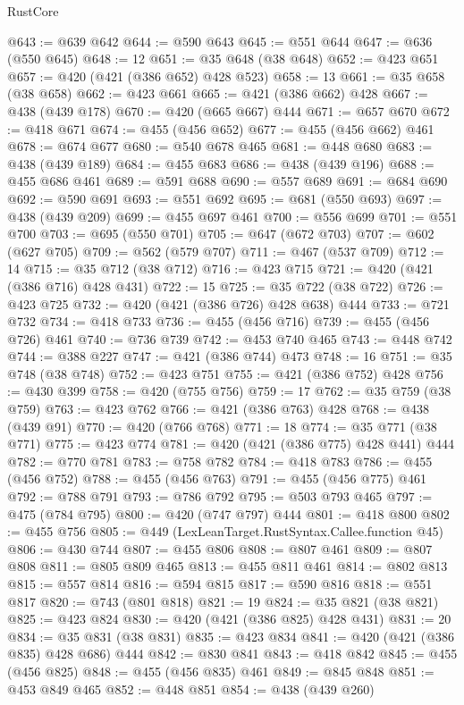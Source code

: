 \begin{lexlean}{RustCore}
\begin{coremodule}
@643 := @639 @642
@644 := @590 @643
@645 := @551 @644
@647 := @636 (@550 @645)
@648 := 12
@651 := @35 @648 (@38 @648)
@652 := @423 @651
@657 := @420 (@421 (@386 @652) @428 @523)
@658 := 13
@661 := @35 @658 (@38 @658)
@662 := @423 @661
@665 := @421 (@386 @662) @428
@667 := @438 (@439 @178)
@670 := @420 (@665 @667) @444
@671 := @657 @670
@672 := @418 @671
@674 := @455 (@456 @652)
@677 := @455 (@456 @662) @461
@678 := @674 @677
@680 := @540 @678 @465
@681 := @448 @680
@683 := @438 (@439 @189)
@684 := @455 @683
@686 := @438 (@439 @196)
@688 := @455 @686 @461
@689 := @591 @688
@690 := @557 @689
@691 := @684 @690
@692 := @590 @691
@693 := @551 @692
@695 := @681 (@550 @693)
@697 := @438 (@439 @209)
@699 := @455 @697 @461
@700 := @556 @699
@701 := @551 @700
@703 := @695 (@550 @701)
@705 := @647 (@672 @703)
@707 := @602 (@627 @705)
@709 := @562 (@579 @707)
@711 := @467 (@537 @709)
@712 := 14
@715 := @35 @712 (@38 @712)
@716 := @423 @715
@721 := @420 (@421 (@386 @716) @428 @431)
@722 := 15
@725 := @35 @722 (@38 @722)
@726 := @423 @725
@732 := @420 (@421 (@386 @726) @428 @638) @444
@733 := @721 @732
@734 := @418 @733
@736 := @455 (@456 @716)
@739 := @455 (@456 @726) @461
@740 := @736 @739
@742 := @453 @740 @465
@743 := @448 @742
@744 := @388 @227
@747 := @421 (@386 @744) @473
@748 := 16
@751 := @35 @748 (@38 @748)
@752 := @423 @751
@755 := @421 (@386 @752) @428
@756 := @430 @399
@758 := @420 (@755 @756)
@759 := 17
@762 := @35 @759 (@38 @759)
@763 := @423 @762
@766 := @421 (@386 @763) @428
@768 := @438 (@439 @91)
@770 := @420 (@766 @768)
@771 := 18
@774 := @35 @771 (@38 @771)
@775 := @423 @774
@781 := @420 (@421 (@386 @775) @428 @441) @444
@782 := @770 @781
@783 := @758 @782
@784 := @418 @783
@786 := @455 (@456 @752)
@788 := @455 (@456 @763)
@791 := @455 (@456 @775) @461
@792 := @788 @791
@793 := @786 @792
@795 := @503 @793 @465
@797 := @475 (@784 @795)
@800 := @420 (@747 @797) @444
@801 := @418 @800
@802 := @455 @756
@805 := @449 (LexLeanTarget.RustSyntax.Callee.function @45)
@806 := @430 @744
@807 := @455 @806
@808 := @807 @461
@809 := @807 @808
@811 := @805 @809 @465
@813 := @455 @811 @461
@814 := @802 @813
@815 := @557 @814
@816 := @594 @815
@817 := @590 @816
@818 := @551 @817
@820 := @743 (@801 @818)
@821 := 19
@824 := @35 @821 (@38 @821)
@825 := @423 @824
@830 := @420 (@421 (@386 @825) @428 @431)
@831 := 20
@834 := @35 @831 (@38 @831)
@835 := @423 @834
@841 := @420 (@421 (@386 @835) @428 @686) @444
@842 := @830 @841
@843 := @418 @842
@845 := @455 (@456 @825)
@848 := @455 (@456 @835) @461
@849 := @845 @848
@851 := @453 @849 @465
@852 := @448 @851
@854 := @438 (@439 @260)

\end{coremodule}
\end{lexlean}

